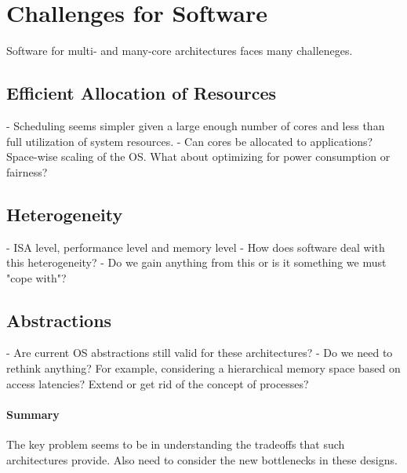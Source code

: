 \section{Challenges for Software}
\label{sec:challenges}

Software for multi- and many-core architectures faces many challeneges.

\subsection{Efficient Allocation of Resources}

- Scheduling seems simpler given a large enough number of cores and less than
full utilization of system resources.
- Can cores be allocated to applications? Space-wise scaling of the OS. What
about optimizing for power consumption or fairness?

\subsection{Heterogeneity}

- ISA level, performance level and memory level
- How does software deal with this heterogeneity?
- Do we gain anything from this or is it something we must "cope with"?

\subsection{Abstractions}

- Are current OS abstractions still valid for these architectures?
- Do we need to rethink anything? For example, considering a hierarchical memory
space based on access latencies? Extend or get rid of the concept of processes?

\paragraph{Summary}
The key problem seems to be in understanding the tradeoffs that such architectures
provide. Also need to consider the new bottlenecks in these designs.
